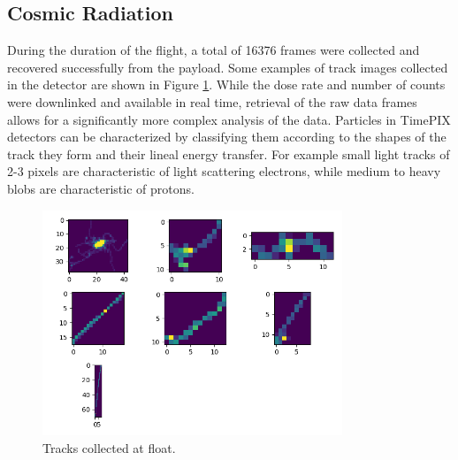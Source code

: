 \subsection{Cosmic Radiation}
\label{sec:Cosmic-Radiation-Results}

During the duration of the flight, a total of 16376 frames were collected and recovered successfully from the payload. Some examples of track images collected in the detector are shown in Figure \ref{tracks}. While the dose rate and number of counts were downlinked and available in real time, retrieval of the raw data frames allows for a significantly more complex analysis of the data. Particles in TimePIX detectors can be characterized by classifying them according to the shapes of the track they form and their lineal energy transfer. For example small light tracks of 2-3 pixels are characteristic of light scattering electrons, while medium to heavy blobs are characteristic of protons.

\begin{figure}[H]
	\begin{center}
	\includegraphics[width=0.8\textwidth]{figures/tracks.png}
	\caption{Tracks collected at float.}
	\label{tracks}
	\end{center}
\end{figure}

